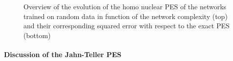 \documentclass[12pt]{article}
\begin{document}
\begin{figure}[H]
	\centering
	\begin{subfigure}
		\texttt{[image: "Linear\_PES\_random"]}
	\end{subfigure}
	\begin{subfigure}
		\texttt{[image: "Linear\_PES\_MSE\_random"]}
	\end{subfigure}
	\caption{Overview of the evolution of the homo nuclear PES of the networks trained on random data in function of the network complexity (top) and their corresponding squared error with respect to the exact PES (bottom)}
	\label{fig:PES_random}
\end{figure}
\newpage
\paragraph{Discussion of the Jahn-Teller PES}
\end{document}
